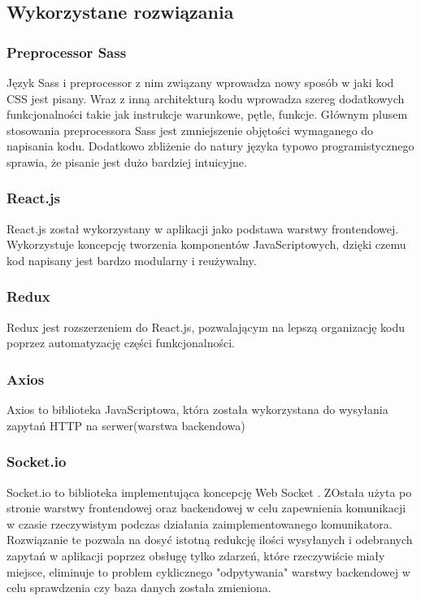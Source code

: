 \documentclass[eng,printmode]{mgr}
\begin{document}
\subsection{Wykorzystane rozwiązania}

\subsubsection{Preprocessor Sass}
Język Sass i preprocessor z nim związany \cite {SASS} wprowadza nowy sposób w jaki kod CSS jest pisany. Wraz z inną architekturą kodu wprowadza szereg dodatkowych funkcjonalności takie jak instrukcje warunkowe, pętle, funkcje. Głównym plusem stosowania preprocessora Sass jest zmniejszenie objętości wymaganego do napisania kodu. Dodatkowo zbliżenie do natury języka typowo programistycznego sprawia, że pisanie jest dużo bardziej intuicyjne.

\subsubsection{React.js}
React.js \cite {React} został wykorzystany w aplikacji jako podstawa warstwy frontendowej. Wykorzystuje koncepcję tworzenia komponentów JavaScriptowych, dzięki czemu kod napisany jest bardzo modularny i reużywalny.

\subsubsection{Redux}
Redux \cite {Redux} jest rozszerzeniem do React.js, pozwalającym na lepszą organizację kodu poprzez automatyzację części funkcjonalności.

\subsubsection{Axios}
Axios \cite {Axios} to biblioteka JavaScriptowa, która została wykorzystana do wysyłania zapytań HTTP na serwer(warstwa backendowa)

\subsubsection{Socket.io}
Socket.io \cite {Socket.io} to biblioteka implementująca koncepcję Web Socket \cite {web_socket}. ZOstała użyta po stronie warstwy frontendowej oraz backendowej w celu zapewnienia komunikacji w czasie rzeczywistym podczas działania zaimplementowanego komunikatora. Rozwiązanie te pozwala na dosyć istotną redukcję ilości wysyłanych i odebranych zapytań w aplikacji poprzez obsługę tylko zdarzeń, które rzeczywiście miały miejsce, eliminuje to problem cyklicznego "odpytywania" warstwy backendowej w celu sprawdzenia czy baza danych została zmieniona.
\end{document}
